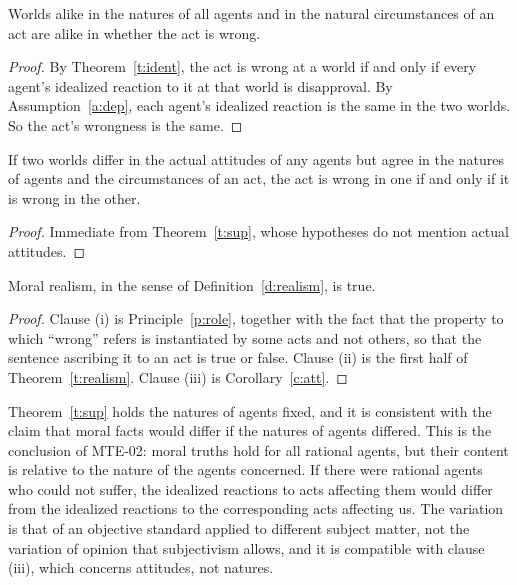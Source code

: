 \documentclass{situationist-preprint}
\begin{document}
\begin{theorem}[Supervenience]\label{t:sup}
Worlds alike in the natures of all agents and in the natural circumstances of an act are alike in whether the act is wrong.
\end{theorem}

\begin{proof}
By Theorem~\ref{t:ident}, the act is wrong at a world if and only if every agent's idealized reaction to it at that world is disapproval. By Assumption~\ref{a:dep}, each agent's idealized reaction is the same in the two worlds. So the act's wrongness is the same.
\end{proof}

\begin{corollary}\label{c:att}
If two worlds differ in the actual attitudes of any agents but agree in the natures of agents and the circumstances of an act, the act is wrong in one if and only if it is wrong in the other.
\end{corollary}

\begin{proof}
Immediate from Theorem~\ref{t:sup}, whose hypotheses do not mention actual attitudes.
\end{proof}

\begin{theorem}\label{t:mr}
Moral realism, in the sense of Definition~\ref{d:realism}, is true.
\end{theorem}

\begin{proof}
Clause (i) is Principle~\ref{p:role}, together with the fact that the property to which \enquote{wrong} refers is instantiated by some acts and not others, so that the sentence ascribing it to an act is true or false. Clause (ii) is the first half of Theorem~\ref{t:realism}. Clause (iii) is Corollary~\ref{c:att}.
\end{proof}

\begin{remark}\label{r:nature}
Theorem~\ref{t:sup} holds the natures of agents fixed, and it is consistent with the claim that moral facts would differ if the natures of agents differed. This is the conclusion of MTE-02: moral truths hold for all rational agents, but their content is relative to the nature of the agents concerned. If there were rational agents who could not suffer, the idealized reactions to acts affecting them would differ from the idealized reactions to the corresponding acts affecting us. The variation is that of an objective standard applied to different subject matter, not the variation of opinion that subjectivism allows, and it is compatible with clause (iii), which concerns attitudes, not natures.
\end{remark}
\end{document}
